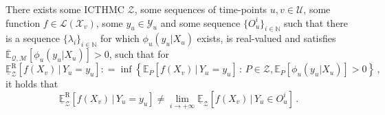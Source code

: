 \documentclass[twoside,11pt]{article}
\newcommand{\nats}{\mathbb{N}}
\newcommand{\states}{\mathcal{X}}
\newcommand{\observs}{\mathcal{Y}}
\newcommand{\uexp}{\overline{\mathbb{E}}_{\rateset,\mathcal{M}}}
\newcommand{\gambles}{\mathcal{L}}
\newcommand{\rateset}{\mathcal{Q}}
\newcommand{\coloneqq}{:\!=}
\begin{document}
\begin{proposition}\label{prop:counter_example_regular}
There exists some ICTHMC $\mathcal{Z}$, some sequences of time-points $u,v\in\mathcal{U}$, some function $f\in\gambles(\states_v)$, some $y_u\in\observs_u$ and some sequence $\{O_u^i\}_{i\in\nats}$ such that there is a sequence $\{\lambda_i\}_{i\in\nats}$ for which $\phi_u(y_u\vert X_u)$ exists, is real-valued and satisfies $\uexp[\phi_u(y_u\vert X_u)]>0$, such that for
\begin{equation*}
\underline{\mathbb{E}}_\mathcal{Z}^\mathrm{R}[f(X_v)\,\vert\, Y_u=y_u] \coloneqq \inf\left\{ \mathbb{E}_P[f(X_v)\,\vert\,Y_u=y_u]\,:\,P\in\mathcal{Z}, \mathbb{E}_P[\phi_u(y_u\vert X_u)]>0  \right\}\,,
\end{equation*}
it holds that
\begin{equation*}
\underline{\mathbb{E}}_\mathcal{Z}^\mathrm{R}[f(X_v)\,\vert\, Y_u=y_u] \neq \lim_{i\to+\infty} \underline{\mathbb{E}}_\mathcal{Z}[f(X_v)\,\vert\, Y_u\in O_u^i]\,.
\end{equation*}
\end{proposition}
\end{document}
